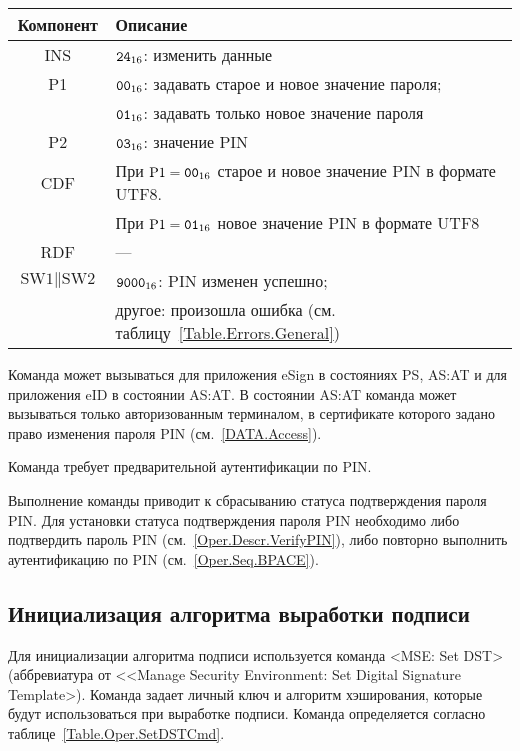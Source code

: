 \begin{table}[hbt]
\caption{}\label{Table.Oper.ChangePINCmd}
\begin{tabular}{|c|p{14cm}|}
\hline
Компонент & 	Описание \\
\hline
\hline
INS & $\texttt{24}_{16}$: изменить данные\\
\hline
P1 & $\texttt{00}_{16}$: задавать старое и новое значение пароля; \\
   & $\texttt{01}_{16}$: задавать только новое значение пароля\\
\hline
P2 & $\texttt{03}_{16}$: значение PIN \\
\hline
CDF & При $\text{P1}=\texttt{00}_{16}$ старое и новое значение PIN в формате UTF8.\\
    & При $\text{P1}=\texttt{01}_{16}$ новое значение PIN в формате UTF8\\
\hline 
RDF & 	 --- \\
\hline
$\text{SW1}\parallel\text{SW2}$ & 
 $\texttt{9000}_{16}$: PIN изменен успешно; \\
  & другое: произошла ошибка (см. таблицу~\ref{Table.Errors.General})\\
\hline
\end{tabular}
\end{table}

Команда может вызываться для приложения eSign в состояниях 
PS, AS:AT и для приложения eID в состоянии AS:AT. 
В состоянии AS:AT команда может вызываться 
только авторизованным терминалом,
в сертификате которого задано право изменения пароля PIN
(см.~\ref{DATA.Access}).

Команда требует предварительной аутентификации по PIN. 

Выполнение команды приводит к сбрасыванию 
статуса подтверждения пароля PIN.
Для установки статуса подтверждения пароля PIN 
необходимо либо подтвердить пароль PIN (см.~\ref{Oper.Descr.VerifyPIN}), 
либо повторно выполнить аутентификацию по PIN (см.~\ref{Oper.Seq.BPACE}).


\subsection{Инициализация алгоритма выработки подписи}
\label{Oper.Descr.SetDST}

Для инициализации алгоритма подписи используется команда     
<MSE: Set DST> (аббревиатура от <<Manage Security Environment: Set 
Digital Signature Template>).
Команда задает личный ключ и алгоритм
хэширования, которые будут использоваться при выработке подписи.
Команда определяется согласно таблице~\ref{Table.Oper.SetDSTCmd}.

